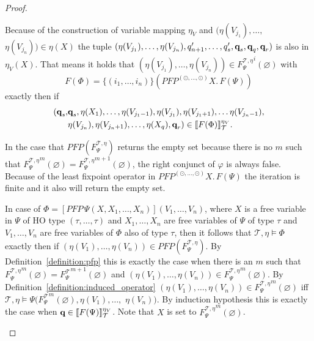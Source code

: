 \begin{proof}
\begin{compactitem}
		Because of the construction of variable mapping $\eta_V$ and $(\eta(V_{j_1}), \dots, 
        $ $\eta(V_{j_n})) \in \eta(X)$ the
        tuple $(\eta(V_{j_1}), \dots, \eta(V_{j_n}), q_{n+1}', \dots, q_s', \emph{q}_s, 
        \emph{q}_q,  \emph{q}_r)$ is also in $\eta_V(X)$.
         That means it holds that $(\eta(V_{j_1}), \dots, \eta(V_{j_n})) \in {F_\Psi^{\mathcal{T},\eta}}^i(\varnothing)$ with
        \[F(\Phi) = \{(i_1, \dots, i_n)\} (PFP^{(\odot, \dots, \odot)} X.\, F(\Psi)) \]
        exactly then if
        \begin{align*}
        (\emph{q}_s, &\emph{q}_s, \eta(X_1), \dots, \eta(V_{j_1-1}), \eta(V_{j_1}), \eta(V_{j_1+1}), \dots \eta(V_{j_n-1}),\\& \eta(V_{j_n}), \eta(V_{j_n+1}), \dots, \eta
            (X_q), \emph{q}_r) \in \llbracket F(\Phi) \rrbracket_\mathcal{T}^{\eta_V}.
        \end{align*}
        
        In the case that $PFP(F_\Psi^{\mathcal{T},\eta})$ returns the empty set because there is no $m$ such that ${F_\Psi^{\mathcal{T},\eta}}^m(\varnothing) = {F_\Psi^		
       {\mathcal{T},\eta}}^{m+1}(\varnothing)$, the right conjunct of $\varphi$ is always false. Because of the least fixpoint operator in $PFP^{(\odot, \dots, \odot)} X.\, F(\Psi)$ the iteration is finite and it also will return the empty set.

        \item In case of $\Phi = [PFP\,\Psi(X, X_1, \dots, X_n)](V_1, \dots, V_n)$, where $X$ is a
        free variable in $\Psi$ of HO type $(\tau, \dots, \tau)$ and $X_1, \dots, X_n$ are free 
        variables of $\Psi$ of type $\tau$ and $V_1, \dots, V_n$ are free variables of $\Phi$ also of 
        type $\tau$, then it follows that $\mathcal{T}, \eta \models \Phi$ exactly then if $(\eta(V_1), 
        \dots, \eta(V_n)) \in PFP(F_\Psi^{\mathcal{T},\eta})$. By Definition~\ref{definition:pfp} this is exactly the 
        case when there is an $m$ such that ${F_\Psi^{\mathcal{T},\eta}}^m(\varnothing) = {F_\Psi^		
        \mathcal{T}}^{m+1}(\varnothing)$ and $(\eta(V_1), \dots, \eta(V_n)) \in {F_\Psi^{\mathcal{T},\eta}}
        ^m(\varnothing)$. By Definition~\ref{definition:induced_operator} $(\eta(V_1), \dots, 		
        \eta(V_n)) \in {F_\Psi^{\mathcal{T},\eta}}^m(\varnothing)$ iff $\mathcal{T}, \eta \models \Psi({F_\Psi^
        \mathcal{T}}^{m}(\varnothing), \eta(V_1), \dots, $ $\eta(V_n))$. By induction hypothesis 
        this is exactly the case when $\emph{q} \in \llbracket F(\Psi) \rrbracket_\mathcal{T}
        ^{\eta_V}$. Note that $X$ is set to ${F_\Psi^{\mathcal{T},\eta}}^{m}(\varnothing)$.
		         

\end{compactitem}
\end{proof}

